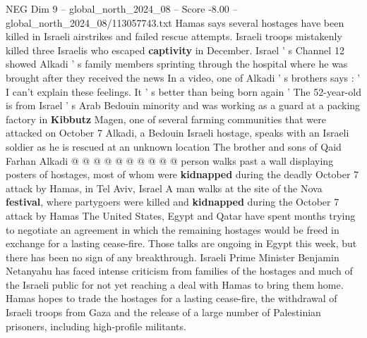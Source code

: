 \begin{textsample}{NEG Dim 9 – global\_north\_2024\_08 – Score -8.00 – global\_north\_2024\_08/113057743.txt}
Hamas says several hostages have been killed in Israeli airstrikes and failed rescue attempts.
Israeli troops mistakenly killed three Israelis who escaped \textbf{captivity} in December.
Israel ' s Channel 12 showed Alkadi ' s family members sprinting through the hospital where he was brought after they received the news In a video, one of Alkadi ' s brothers says : ' I can't explain these feelings.
It ' s better than being born again ' The 52-year-old is from Israel ' s Arab Bedouin minority and was working as a guard at a packing factory in \textbf{Kibbutz} Magen, one of several farming communities that were attacked on October 7 Alkadi, a Bedouin Israeli hostage, speaks with an Israeli soldier as he is rescued at an unknown location The brother and sons of Qaid Farhan Alkadi @ @ @ @ @ @ @ @ @ @ person walks past a wall displaying posters of hostages, most of whom were \textbf{kidnapped} during the deadly October 7 attack by Hamas, in Tel Aviv, Israel A man walks at the site of the Nova \textbf{festival}, where partygoers were killed and \textbf{kidnapped} during the October 7 attack by Hamas The United States, Egypt and Qatar have spent months trying to negotiate an agreement in which the remaining hostages would be freed in exchange for a lasting cease-fire.
Those talks are ongoing in Egypt this week, but there has been no sign of any breakthrough.
Israeli Prime Minister Benjamin Netanyahu has faced intense criticism from families of the hostages and much of the Israeli public for not yet reaching a deal with Hamas to bring them home.
Hamas hopes to trade the hostages for a lasting cease-fire, the withdrawal of Israeli troops from Gaza and the release of a large number of Palestinian prisoners, including high-profile militants.

\end{textsample}
